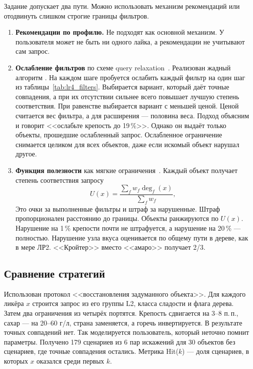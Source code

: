 Задание допускает два пути. Можно использовать механизм рекомендаций или отодвинуть слишком строгие границы фильтров.
\begin{enumerate}[leftmargin=1.6\parindent]
	\item \textbf{Рекомендации по профилю.} Не подходят как основной механизм. У пользователя может не быть ни одного лайка, а рекомендации не учитывают сам запрос.
	\item \textbf{Ослабление фильтров} по схеме query relaxation~\cite{jannach2009}. Реализован жадный алгоритм . На каждом шаге пробуется ослабить каждый фильтр на один шаг из таблицы~\ref{tab:lr4_filters}. Выбирается вариант, который даёт точные совпадения, а при их отсутствии сильнее всего повышает лучшую степень соответствия. При равенстве выбирается вариант с меньшей ценой. Ценой считается вес фильтра, а для расширения --- половина веса. Подход объясним и говорит <<ослабьте крепость до 19\,\%>>. Однако он выдаёт только объекты, прошедшие ослабленный запрос. Ослабленное ограничение снимается целиком для всех объектов, даже если искомый объект нарушал другое.
	\item \textbf{Функция полезности} как мягкие ограничения~\cite{mcsherry2003}. Каждый объект получает степень соответствия запросу
	\begin{equation}
		U(x) = \frac{\sum_f w_f \deg_f(x)}{\sum_f w_f},
		\label{eq:lr4_utility}
	\end{equation}
	Это очки за выполненные фильтры и штраф за нарушенные. Штраф пропорционален расстоянию до границы. Объекты ранжируются по $U(x)$. Нарушение на 1\,\% крепости почти не штрафуется, а нарушение на 20\,\% --- полностью. Нарушение узла вкуса оценивается по общему пути в дереве, как в мере ЛР2. <<Кройтер>> вместо <<амаро>> получает 2/3.
\end{enumerate}

\subsection{Сравнение стратегий}

Использован протокол <<восстановления задуманного объекта>>. Для каждого ликёра $x$ строится запрос из его группы L2, класса сладости и флага дерева. Затем два ограничения из четырёх портятся. Крепость сдвигается на 3--8 п.\,п., сахар --- на 20--60 г/л, страна заменяется, а горечь инвертируется. В результате точных совпадений нет. Так моделируется пользователь, который неточно помнит параметры. Получено 179 сценариев из 6 пар искажений для 30 объектов без сценариев, где точные совпадения остались. Метрика Hit($k$) --- доля сценариев, в которых $x$ оказался среди первых $k$.

